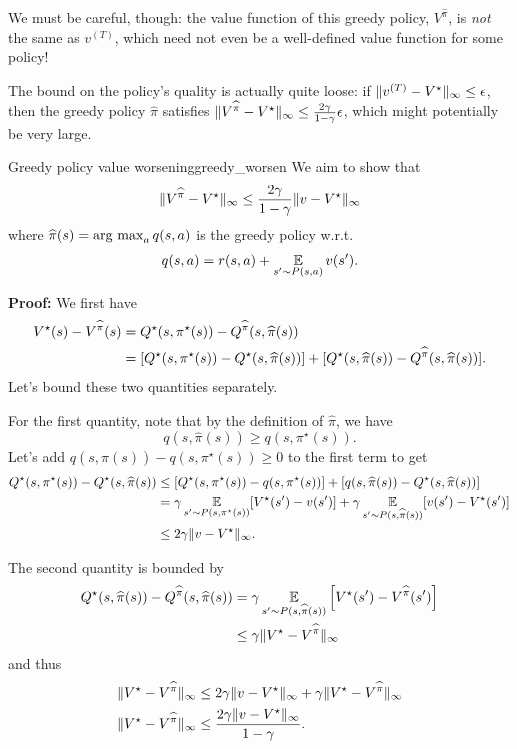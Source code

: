 \documentclass[\main/main]{subfiles}
\begin{document}
We must be careful, though: the value function of this greedy policy, $V^{\hat \pi}$, is \emph{not} the same as $v^{(T)}$, which need not even be a well-defined value function for some policy!

The bound on the policy's quality is actually quite loose: if $\|v^{(T)} - V^\star\|_{\infty} \le \epsilon$, then the greedy policy $\hat \pi$ satisfies $\|V^{\widehat \pi} - V^\star\|_{\infty} \le \frac{2\gamma}{1-\gamma} \epsilon$, which might potentially be very large.

\begin{theorem}{Greedy policy value worsening}{greedy_worsen}
    We aim to show that
    \[
        \|V^{\widehat \pi} - V^\star \|_{\infty} \le \frac{2 \gamma}{1-\gamma} \|v - V^\star\|_{\infty}
    \]
    where $\widehat \pi(s) = \operatorname*{\textrm{arg\ max}}_a q(s, a)$ is the greedy policy w.r.t. \[ q(s, a) = r(s, a) + \operatorname*{\mathbb{E}}_{s' \sim P(s, a)} v(s'). \]

    \textbf{Proof:} We first have
    \begin{align*}
        V^\star(s) - V^{\widehat \pi}(s) &= Q^\star(s,\pi^\star(s)) - Q^{\widehat \pi}(s, \widehat \pi(s))\\
        &= [Q^\star(s,\pi^\star(s)) - Q^\star(s, \widehat \pi(s))] + [Q^\star(s, \widehat \pi(s)) - Q^{\widehat \pi}(s, \widehat \pi(s))].
    \end{align*}
    Let's bound these two quantities separately.

    For the first quantity, note that by the definition of $\hat \pi$, we have
    \[ q(s, \hat \pi(s)) \ge q(s,\pi^\star(s)). \]
    Let's add $q(s, \hat \pi(s)) - q(s,\pi^\star(s)) \ge 0$ to the first term to get
    \begin{align*}
        Q^\star(s,\pi^\star(s)) - Q^\star(s, \widehat \pi(s)) &\le [Q^\star(s,\pi^\star(s))- q(s,\pi^\star(s))] + [q(s, \widehat \pi(s)) - Q^\star(s, \widehat \pi(s))] \\
        &= \gamma \operatorname*{\mathbb{E}}_{s' \sim P(s, \pi^{\star}(s))} [ V^\star(s') - v(s') ] + \gamma \operatorname*{\mathbb{E}}_{s' \sim P(s, \widehat \pi(s))} [ v(s') - V^\star(s') ] \\
        &\le 2 \gamma \|v - V^\star\|_{\infty}.
    \end{align*}

    The second quantity is bounded by
    \begin{align*}
        Q^\star(s, \widehat \pi(s)) - Q^{\widehat \pi}(s, \widehat \pi(s))
        &=
        \gamma \operatorname*{\mathbb{E}}_{s'\sim P(s, \widehat \pi(s))}\left[ V^\star(s') - V^{\widehat \pi}(s') \right] \\
        & \leq 
        \gamma \|V^\star - V^{\widehat \pi}\|_\infty
    \end{align*}
    and thus
    \begin{align*}
        \|V^\star - V^{\widehat \pi}\|_\infty &\le 2 \gamma \|v - V^\star\|_{\infty} + \gamma \|V^\star - V^{\widehat \pi}\|_\infty \\
        \|V^\star - V^{\widehat \pi}\|_\infty &\le \frac{2 \gamma \|v - V^\star\|_{\infty}}{1-\gamma}.
    \end{align*}
\end{theorem}
\end{document}
